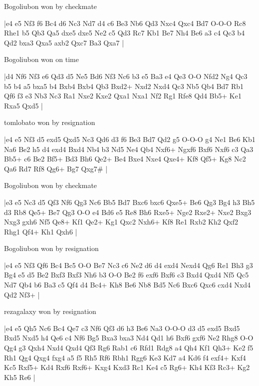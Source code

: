 \showboard

Bogoliubon won by checkmate

\makegametitle
|e4 e5 Nf3 f6 Bc4 d6 Nc3 Nd7 d4 c6 Be3 Nb6 Qd3 Nxc4 Qxc4 Bd7 O-O-O Rc8 Rhe1 b5 Qb3 Qa5 dxe5 dxe5 Ne2 c5 Qd3 Rc7 Kb1 Be7 Nh4 Be6 a3 c4 Qc3 b4 Qd2 bxa3 Qxa5 axb2 Qxc7 Ba3 Qxa7  |

\showboard

Bogoliubon won on time

\makegametitle
|d4 Nf6 Nf3 e6 Qd3 d5 Ne5 Bd6 Nf3 Nc6 b3 e5 Ba3 e4 Qe3 O-O Nfd2 Ng4 Qc3 b5 b4 a5 bxa5 b4 Bxb4 Bxb4 Qb3 Bxd2+ Nxd2 Nxd4 Qc3 Nb5 Qb4 Bd7 Rb1 Qf6 f3 e3 Nb3 Nc3 Ra1 Nxe2 Kxe2 Qxa1 Nxa1 Nf2 Rg1 Rfe8 Qd4 Bb5+ Ke1 Rxa5 Qxd5  |

\showboard

tomlobato won by resignation

\makegametitle
|e4 e5 Nf3 d5 exd5 Qxd5 Nc3 Qd6 d3 f6 Be3 Bd7 Qd2 g5 O-O-O g4 Ne1 Be6 Kb1 Na6 Be2 h5 d4 exd4 Bxd4 Nb4 b3 Nd5 Ne4 Qb4 Nxf6+ Ngxf6 Bxf6 Nxf6 c3 Qa3 Bb5+ c6 Be2 Bf5+ Bd3 Bh6 Qe2+ Be4 Bxe4 Nxe4 Qxe4+ Kf8 Qf5+ Kg8 Nc2 Qa6 Rd7 Rf8 Qg6+ Bg7 Qxg7\#  |

\showboard

Bogoliubon won by checkmate

\makegametitle
|e3 e5 Nc3 d5 Qf3 Nf6 Qg3 Nc6 Bb5 Bd7 Bxc6 bxc6 Qxe5+ Be6 Qg3 Bg4 h3 Bh5 d3 Rb8 Qe5+ Be7 Qg3 O-O e4 Bd6 e5 Re8 Bh6 Rxe5+ Nge2 Rxe2+ Nxe2 Bxg3 Nxg3 gxh6 Nf5 Qe8+ Kf1 Qe2+ Kg1 Qxc2 Nxh6+ Kf8 Re1 Rxb2 Kh2 Qxf2 Rhg1 Qf4+ Kh1 Qxh6  |

\showboard

Bogoliubon won by resignation

\makegametitle
|e4 e5 Nf3 Qf6 Bc4 Bc5 O-O Be7 Nc3 c6 Ne2 d6 d4 exd4 Nexd4 Qg6 Re1 Bh3 g3 Bg4 e5 d5 Be2 Bxf3 Bxf3 Nh6 b3 O-O Be2 f6 exf6 Bxf6 c3 Bxd4 Qxd4 Nf5 Qc5 Nd7 Qb4 b6 Ba3 c5 Qf4 d4 Bc4+ Kh8 Be6 Nb8 Bd5 Nc6 Bxc6 Qxc6 cxd4 Nxd4 Qd2 Nf3+  |

\showboard

rezagalaxy won by resignation

\makegametitle
|e4 e5 Qh5 Nc6 Bc4 Qe7 c3 Nf6 Qf3 d6 h3 Be6 Na3 O-O-O d3 d5 exd5 Bxd5 Bxd5 Nxd5 h4 Qe6 c4 Nf6 Bg5 Bxa3 bxa3 Nd4 Qd1 h6 Bxf6 gxf6 Ne2 Rhg8 O-O Qg4 g3 Qxh4 Nxd4 Qxd4 Qf3 Rg6 Rab1 c6 Rfd1 Rdg8 a4 Qh4 Kf1 Qh3+ Ke2 f5 Rh1 Qg4 Qxg4 fxg4 a5 f5 Rh5 Rf6 Rbh1 Rgg6 Ke3 Kd7 a4 Kd6 f4 exf4+ Kxf4 Kc5 Rxf5+ Kd4 Rxf6 Rxf6+ Kxg4 Kxd3 Rc1 Ke4 c5 Rg6+ Kh4 Kf3 Rc3+ Kg2 Kh5 Re6  |

